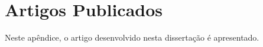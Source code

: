 \chapter{Artigos Publicados}
Neste apêndice, o artigo desenvolvido nesta dissertação é apresentado.
